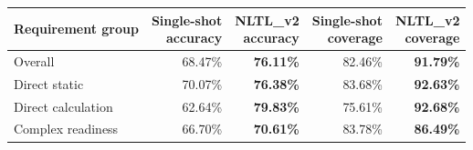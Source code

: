 \begin{tabular}{lrrrr}
\toprule
Requirement group & \shortstack{Single-shot\\accuracy} & \shortstack{NLTL\_v2\\accuracy} & \shortstack{Single-shot\\coverage} & \shortstack{NLTL\_v2\\coverage} \\
\midrule
Overall & 68.47\% & \cellcolor{green!10}\textbf{76.11\%} & 82.46\% & \cellcolor{green!10}\textbf{91.79\%} \\
Direct static & 70.07\% & \cellcolor{green!10}\textbf{76.38\%} & 83.68\% & \cellcolor{green!10}\textbf{92.63\%} \\
Direct calculation & 62.64\% & \cellcolor{green!10}\textbf{79.83\%} & 75.61\% & \cellcolor{green!10}\textbf{92.68\%} \\
Complex readiness & 66.70\% & \cellcolor{green!10}\textbf{70.61\%} & 83.78\% & \cellcolor{green!10}\textbf{86.49\%} \\
\bottomrule
\end{tabular}
